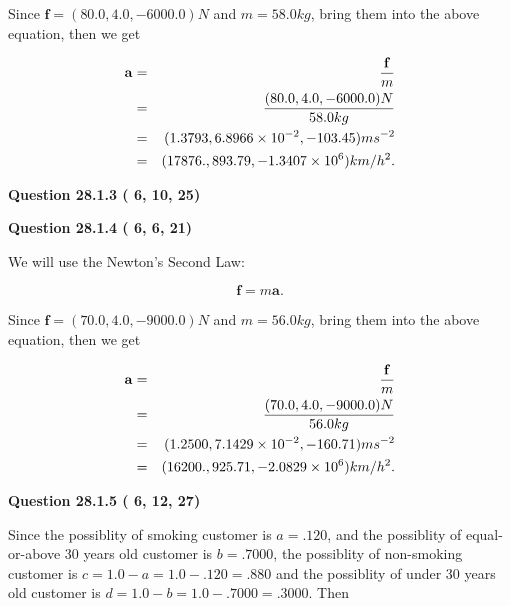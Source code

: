 \documentclass[12pt]{article}
\begin{document}
Since $\mathbf{f}=( %
80.0,  %
4.0,  %
-6000.0 )N$
and $m= %
58.0 kg$, bring them into the above equation, then we get
 
\begin{eqnarray*}
\mathbf{a}&=&\frac{\mathbf{f}}m  \\
&=&\frac{(
80.0 ,
4.0 ,
-6000.0 )N
}{ %
58.0 kg}  \\
&=&(
1.3793 ,
6.8966 \times 10^{-2},
-103.45
)ms^{-2} \\
&=&(
17876. ,
893.79 ,
-1.3407 \times 10^{6}
)km/h^2.
\end{eqnarray*}
 
 
 
  
\vspace{0.2in}
  
{\textbf{\Large{Question
28.1.3 
 (          6,         10,         25)
}}}
  
  
  
\vspace{0.2in}
  
{\textbf{\Large{Question
28.1.4 
 (          6,          6,         21)
}}}
  
  
 
 

We will use the Newton's Second Law:
 
\[
\mathbf{f}=m\mathbf{a}.
\]
 
Since $\mathbf{f}=( %
70.0,  %
4.0,  %
-9000.0 )N$
and $m= %
56.0 kg$, bring them into the above equation, then we get
 
\begin{eqnarray*}
\mathbf{a}&=&\frac{\mathbf{f}}m  \\
&=&\frac{(
70.0 ,
4.0 ,
-9000.0 )N
}{ %
56.0 kg}  \\
&=&(
1.2500 ,
7.1429 \times 10^{-2},
-160.71
)ms^{-2} \\
&=&(
16200. ,
925.71 ,
-2.0829 \times 10^{6}
)km/h^2.
\end{eqnarray*}
 
 
 
  
\vspace{0.2in}
  
{\textbf{\Large{Question
28.1.5 
 (          6,         12,         27)
}}}
  
  
 
 

Since the possiblity of  %
smoking customer is $ a =  %
.120 $,
and the possiblity of  %
equal-or-above 30 years old customer is $ b =  %
.7000 $,
the possiblity of  %
non-smoking customer is $ c = 1.0 - a = 1.0 -
.120
=  %
.880 $ and the possiblity of  %
under 30 years old
customer is $ d = 1.0 - b = 1.0 -  %
.7000 =  %
.3000  $.
Then
 
\end{document}
